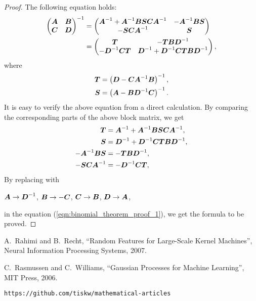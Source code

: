\documentclass[twocolumn,a4paper,10pt]{article}
\begin{document}
\begin{proof}
The following equation holds:
\begin{align*}
    \begin{pmatrix}
        \boldsymbol{A} & \boldsymbol{B} \\
        \boldsymbol{C} & \boldsymbol{D}
    \end{pmatrix}^{-1}
    &= \begin{pmatrix}
        \boldsymbol{A}^{-1} + \boldsymbol{A}^{-1} \boldsymbol{BSCA}^{-1} & - \boldsymbol{A}^{-1} \boldsymbol{BS} \\
        - \boldsymbol{SCA}^{-1}                         & \boldsymbol{S}
    \end{pmatrix} \\
    &= \begin{pmatrix}
        \boldsymbol{T}                & -\boldsymbol{TBD}^{-1} \\
        - \boldsymbol{D}^{-1} \boldsymbol{CT} & \boldsymbol{D}^{-1} + \boldsymbol{D}^{-1} \boldsymbol{CTBD}^{-1}
    \end{pmatrix},
\end{align*}
where
\begin{align}
    \boldsymbol{T} &= \left( \boldsymbol{D} - \boldsymbol{CA}^{-1} \boldsymbol{B} \right)^{-1}, \\
    \boldsymbol{S} &= \left( \boldsymbol{A} - \boldsymbol{BD}^{-1} \boldsymbol{C} \right)^{-1}.
\end{align}
It is easy to verify the above equation from a direct calculation.
By comparing the corresponding parts of the above block matrix, we get
\begin{align}
    \boldsymbol{T} &= \boldsymbol{A}^{-1} + \boldsymbol{A}^{-1} \boldsymbol{BSCA}^{-1},
    \label{eqn:binomial_theorem_proof_1} \\
    \boldsymbol{S} &= \boldsymbol{D}^{-1} + \boldsymbol{D}^{-1} \boldsymbol{CTBD}^{-1}, \\
    - \boldsymbol{A}^{-1} \boldsymbol{BS} &= - \boldsymbol{TBD}^{-1}, \\
    - \boldsymbol{SCA}^{-1} &= - \boldsymbol{D}^{-1} \boldsymbol{CT},
\end{align}
By replacing with
\begin{center}
    $\boldsymbol{A} \to \boldsymbol{D}^{-1}$, \hspace{5pt}
    $\boldsymbol{B} \to -\boldsymbol{C}$, \hspace{5pt}
    $\boldsymbol{C} \to \boldsymbol{B}$, \hspace{5pt}
    $\boldsymbol{D} \to \boldsymbol{A}$,
\end{center}
in the equation (\ref{eqn:binomial_theorem_proof_1}), we get the formula to be proved.
\end{proof}


\newpage

\begin{thebibliography}{9}

    A.~Rahimi and B.~Recht, 
    ``Random Features for Large-Scale Kernel Machines'',
    Neural Information Processing Systems, 2007.

    C.~Rasmussen and C.~Williams, ``Gaussian Processes for Machine Learning'', MIT Press, 2006.

    \texttt{https://github.com/tiskw/mathematical-articles}

\end{thebibliography}
\end{document}

